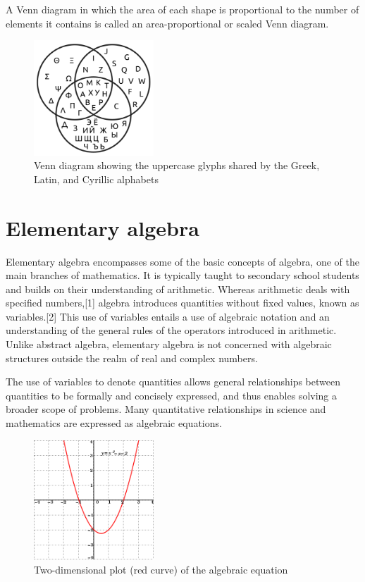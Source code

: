 \documentclass{article}
\begin{document}
A Venn diagram in which the area of each shape is proportional to the number of elements it contains is called an area-proportional or scaled Venn diagram. 
 \begin{figure}[h]
\includegraphics[width=0.4\textwidth]{so.png}
\caption{Venn diagram showing the uppercase glyphs shared by the Greek, Latin, and Cyrillic alphabets}
\end{figure}
\section{Elementary algebra}
Elementary algebra encompasses some of the basic concepts of algebra, one of the main branches of mathematics. It is typically taught to secondary school students and builds on their understanding of arithmetic. Whereas arithmetic deals with specified numbers,[1] algebra introduces quantities without fixed values, known as variables.[2] This use of variables entails a use of algebraic notation and an understanding of the general rules of the operators introduced in arithmetic. Unlike abstract algebra, elementary algebra is not concerned with algebraic structures outside the realm of real and complex numbers.

The use of variables to denote quantities allows general relationships between quantities to be formally and concisely expressed, and thus enables solving a broader scope of problems. Many quantitative relationships in science and mathematics are expressed as algebraic equations. 
\begin{figure}[h]
\includegraphics[width=0.4\textwidth]{sp.png}
\caption{Two-dimensional plot (red curve) of the algebraic equation  }
\end{figure}
\end{document}
